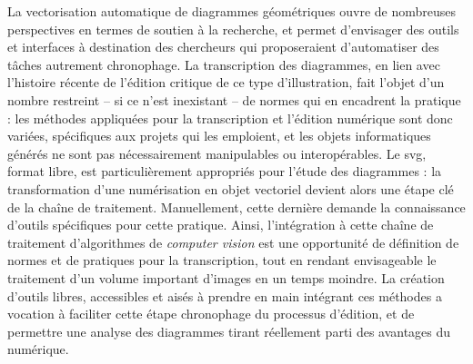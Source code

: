 \documentclass[a4paper,12pt,twoside]{book}
\newcommand{\cv}{\textit{computer vision}\xspace}
\newcommand{\svg}{\gls{svg}\xspace}
\newcommand{\clearemptydoublepage}{\newpage{\pagestyle{empty}\cleardoublepage}}
\begin{document}
        La vectorisation automatique de diagrammes géométriques ouvre de nombreuses perspectives en termes de soutien à la recherche, et permet d'envisager des outils et interfaces à destination des chercheurs qui proposeraient d'automatiser des tâches autrement chronophage. La transcription des diagrammes, en lien avec l'histoire récente de l'édition critique de ce type d'illustration, fait l'objet d'un nombre restreint -- si ce n'est inexistant -- de normes qui en encadrent la pratique : les méthodes appliquées pour la transcription et l'édition numérique sont donc variées, spécifiques aux projets qui les emploient, et les objets informatiques générés ne sont pas nécessairement manipulables ou interopérables. Le \svg, format libre, est particulièrement appropriés pour l'étude des diagrammes : la transformation d'une numérisation en objet vectoriel devient alors une étape clé de la chaîne de traitement. Manuellement, cette dernière demande la connaissance d'outils spécifiques pour cette pratique. Ainsi, l'intégration à cette chaîne de traitement d'algorithmes de \cv est une opportunité de définition de normes et de pratiques pour la transcription, tout en rendant envisageable le traitement d'un volume important d'images en un temps moindre. La création d'outils libres, accessibles et aisés à prendre en main intégrant ces méthodes a vocation à faciliter cette étape chronophage du processus d'édition, et de permettre une analyse des diagrammes tirant réellement parti des avantages du numérique.    
        \clearemptydoublepage
        
\end{document}
